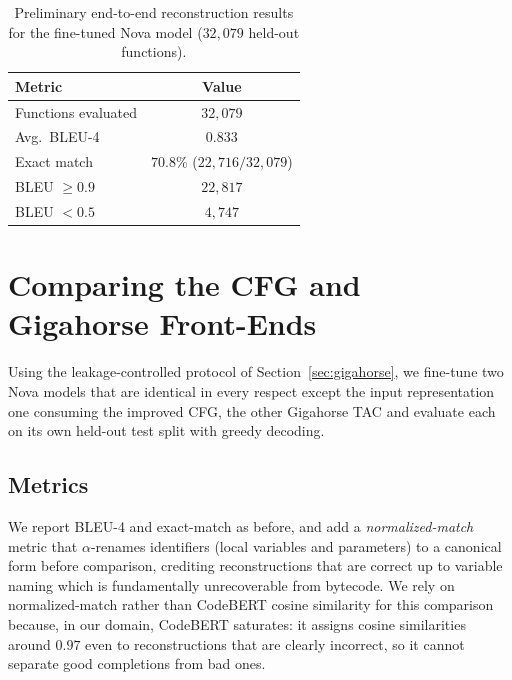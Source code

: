 \documentclass{article}
\begin{document}
\begin{table}[t]
\centering
\caption{Preliminary end-to-end reconstruction results for the fine-tuned Nova
model ($32{,}079$ held-out functions).}
\label{tab:nova}
\small
\begin{tabular}{l c}
\toprule
Metric & Value \\
\midrule
Functions evaluated         & $32{,}079$ \\
Avg.\ BLEU-4                 & $0.833$ \\
Exact match                  & $70.8\%$ \;($22{,}716/32{,}079$) \\
BLEU $\geq 0.9$              & $22{,}817$ \\
BLEU $< 0.5$                 & $4{,}747$ \\
\bottomrule
\end{tabular}
\end{table}

\section{Comparing the CFG and Gigahorse Front-Ends}
\label{sec:frontend-compare}

Using the leakage-controlled protocol of Section~\ref{sec:gigahorse}, we fine-tune
two Nova models that are identical in every respect except the input representation
one consuming the improved CFG, the other Gigahorse TAC and evaluate each on its
own held-out test split with greedy decoding.

\subsection{Metrics}
We report BLEU-4 and exact-match as before, and add a \emph{normalized-match}
metric that $\alpha$-renames identifiers (local variables and parameters) to a
canonical form before comparison, crediting reconstructions that are correct up to
variable naming which is fundamentally unrecoverable from bytecode. We rely on
normalized-match rather than CodeBERT cosine similarity for this comparison
because, in our domain, CodeBERT saturates: it assigns cosine similarities around
$0.97$ even to reconstructions that are clearly incorrect, so it cannot separate
good completions from bad ones.
\end{document}
